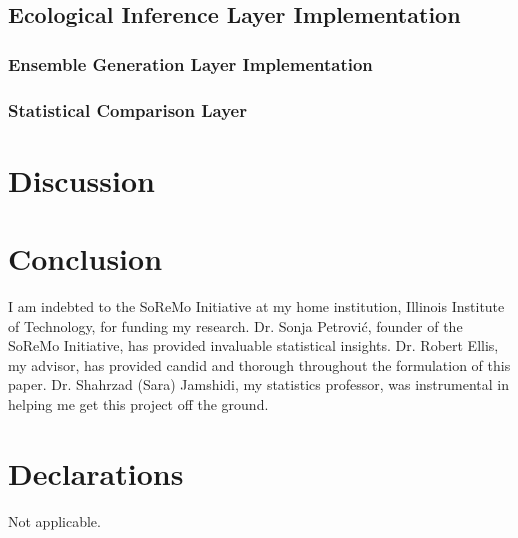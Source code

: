 \documentclass[sn-vancouver,Numbered]{sn-jnl}
\theoremstyle{thmstyleone}%
\theoremstyle{thmstyletwo}%
\theoremstyle{thmstylethree}%
\begin{document}
\subsection{Ecological Inference Layer Implementation}
\subsubsection{Ensemble Generation Layer Implementation}
\subsubsection{Statistical Comparison Layer}


\section{Discussion}\label{sec12}


\section{Conclusion}\label{sec13}


\backmatter




I am indebted to the SoReMo Initiative at my home institution, Illinois Institute of Technology, for funding my research. Dr. Sonja Petrović, founder of the SoReMo Initiative, has provided invaluable statistical insights. Dr. Robert Ellis, my advisor, has provided candid and thorough throughout the formulation of this paper. Dr. Shahrzad (Sara) Jamshidi, my statistics professor, was instrumental in helping me get this project off the ground. 

\section*{Declarations}
Not applicable.


\bigskip




\end{document}
